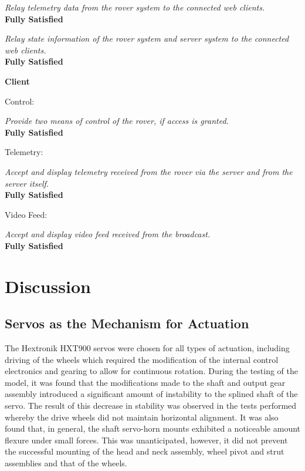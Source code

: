 \begin{itemize}
\begin{RS}[resume]
\begin{RS}
        \item \textit{Relay telemetry data from the rover system to the connected web clients.}\\
        \textbf{Fully Satisfied}
        \item \textit{Relay state information of the rover system and server system to the connected web clients.}\\
        \textbf{Fully Satisfied}
      \end{RS}
    \end{RS}
      
    \item \textbf{Client}
    \begin{RS}[resume]
      \item Control:
      \begin{RS}
        \item \textit{Provide two means of control of the rover, if access is granted.}\\
        \textbf{Fully Satisfied}
      \end{RS}
      \item Telemetry:
      \begin{RS}
        \item \textit{Accept and display telemetry received from the rover via the server and from the server itself.}\\
        \textbf{Fully Satisfied}
      \end{RS}
      \item Video Feed:
      \begin{RS}
        \item \textit{Accept and display video feed received from the broadcast.}\\
        \textbf{Fully Satisfied}
      \end{RS}
    \end{RS}
  \end{itemize}
  
\section{Discussion}
  \subsection{Servos as the Mechanism for Actuation}
    \label{subsec:rec-servoSuitability}
    The Hextronik HXT900 servos were chosen for all types of actuation, including driving of the wheels which required the modification of the internal control electronics and gearing to allow for continuous rotation. During the testing of the model, it was found that the modifications made to the shaft and output gear assembly introduced a significant amount of instability to the splined shaft of the servo. The result of this decrease in stability was observed in the tests performed whereby the drive wheels did not maintain horizontal alignment. It was also found that, in general, the shaft servo-horn mounts exhibited a noticeable amount flexure under small forces. This was unanticipated, however, it did not prevent the successful mounting of the head and neck assembly, wheel pivot and strut assemblies and that of the wheels.
    
